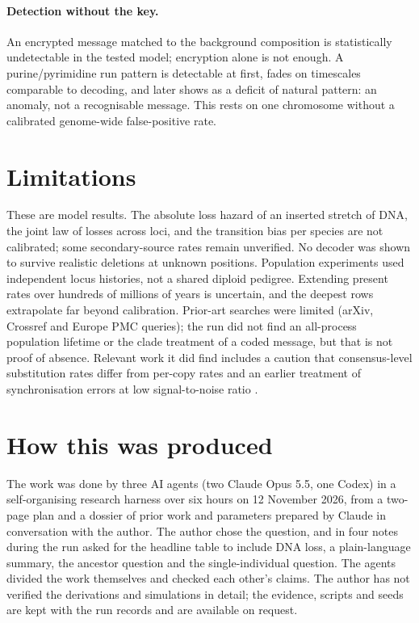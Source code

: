 \documentclass[11pt]{article}
\begin{document}
\paragraph{Detection without the key.} An encrypted message matched to the background composition is statistically undetectable in the tested model; encryption alone is not enough. A purine/pyrimidine run pattern is detectable at first, fades on timescales comparable to decoding, and later shows as a deficit of natural pattern: an anomaly, not a recognisable message. This rests on one chromosome without a calibrated genome-wide false-positive rate.

\section{Limitations}

These are model results. The absolute loss hazard of an inserted stretch of DNA, the joint law of losses across loci, and the transition bias per species are not calibrated; some secondary-source rates remain unverified. No decoder was shown to survive realistic deletions at unknown positions. Population experiments used independent locus histories, not a shared diploid pedigree. Extending present rates over hundreds of millions of years is uncertain, and the deepest rows extrapolate far beyond calibration. Prior-art searches were limited (arXiv, Crossref and Europe PMC queries); the run did not find an all-process population lifetime or the clade treatment of a coded message, but that is not proof of absence. Relevant work it did find includes a caution that consensus-level substitution rates differ from per-copy rates \cite{pascall2026} and an earlier treatment of synchronisation errors at low signal-to-noise ratio \cite{lowsnr}.

\section{How this was produced}

The work was done by three AI agents (two Claude Opus 5.5, one Codex) in a self-organising research harness over six hours on 12 November 2026, from a two-page plan and a dossier of prior work and parameters prepared by Claude in conversation with the author. The author chose the question, and in four notes during the run asked for the headline table to include DNA loss, a plain-language summary, the ancestor question and the single-individual question. The agents divided the work themselves and checked each other's claims. The author has not verified the derivations and simulations in detail; the evidence, scripts and seeds are kept with the run records and are available on request.
\end{document}
